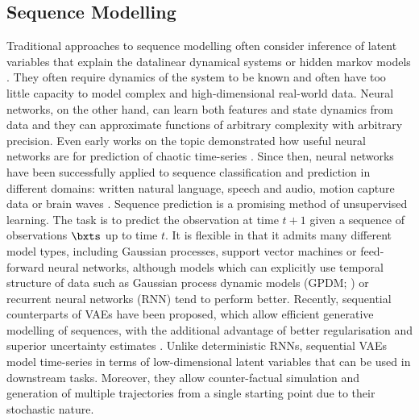     \subsection{Sequence Modelling}
        Traditional approaches to sequence modelling often consider inference of latent variables that explain the data\eg linear dynamical systems or hidden markov models \citep{Bishop2006}.
        They often require dynamics of the system to be known and often have too little capacity to model complex and high-dimensional real-world data.
        Neural networks, on the other hand, can learn both features and state dynamics from data and they can approximate functions of arbitrary complexity with arbitrary precision.
        Even early works on the topic demonstrated how useful neural networks are for prediction of chaotic time-series \citep{Lapedes1988}.
        Since then, neural networks have been successfully applied to sequence classification and prediction in different domains: written natural language, speech and audio, motion capture data or brain waves \citep{Langkvist2014}.
%
%
        Sequence prediction is a promising method of unsupervised learning. The task is to predict the observation at time $t+1$ given a sequence of observations $\bxts$ up to time $t$. It is flexible in that it admits many different model types, including Gaussian processes, support vector machines or feed-forward neural networks, although models which can explicitly use temporal structure of data such as Gaussian process dynamic models (GPDM; \cite{Wang2008}) or recurrent neural networks (RNN) tend to perform better. Recently, sequential counterparts of VAEs have been proposed, which allow efficient generative modelling of sequences, with the additional advantage of better regularisation and superior uncertainty estimates \citep{Fabius2015,Bayer2015,Karl2017,Fortunato2017}. Unlike deterministic RNNs, sequential VAEs model time-series in terms of low-dimensional latent variables that can be used in downstream tasks. Moreover, they allow counter-factual simulation and generation of multiple trajectories from a single starting point due to their stochastic nature.
%        
%      
